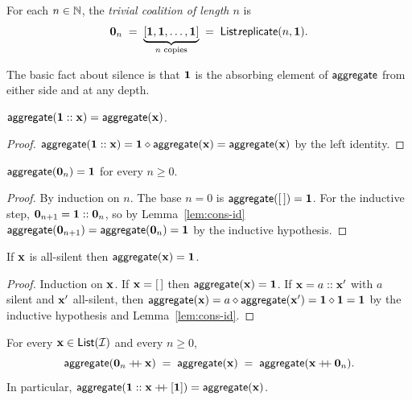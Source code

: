 \begin{definition}\label{def:trivial}
For each $n \in \mathbb{N}$, the \emph{trivial coalition of length $n$} is
\[
  \mathbf{0}_n \;=\; \underbrace{[\mathbf{1}, \mathbf{1}, \ldots, \mathbf{1}]}_{n
  \text{ copies}} \;=\; \mathsf{List}.\!\mathsf{replicate}(n, \mathbf{1}).
\]
\end{definition}

The basic fact about silence is that $\mathbf{1}$ is the absorbing element
of $\mathsf{aggregate}$ from either side and at any depth.

\begin{lemma}\label{lem:cons-id}
$\mathsf{aggregate}(\mathbf{1} :: \mathbf{x}) = \mathsf{aggregate}(\mathbf{x})$.
\end{lemma}

\begin{proof}
$\mathsf{aggregate}(\mathbf{1} :: \mathbf{x}) = \mathbf{1} \mathbin{\diamond} \mathsf{aggregate}(\mathbf{x}) =
\mathsf{aggregate}(\mathbf{x})$ by the left identity.
\end{proof}

\begin{lemma}\label{lem:trivial}
$\mathsf{aggregate}(\mathbf{0}_n) = \mathbf{1}$ for every $n \geq 0$.
\end{lemma}

\begin{proof}
By induction on $n$. The base $n = 0$ is $\mathsf{aggregate}([\,]) = \mathbf{1}$.
For the inductive step, $\mathbf{0}_{n+1} = \mathbf{1} ::
\mathbf{0}_n$, so by Lemma~\ref{lem:cons-id} $\mathsf{aggregate}(\mathbf{0}_{n+1})
= \mathsf{aggregate}(\mathbf{0}_n) = \mathbf{1}$ by the inductive hypothesis.
\end{proof}

\begin{lemma}\label{lem:all-silent}
If $\mathbf{x}$ is all-silent then $\mathsf{aggregate}(\mathbf{x}) = \mathbf{1}$.
\end{lemma}

\begin{proof}
Induction on $\mathbf{x}$. If $\mathbf{x} = [\,]$ then $\mathsf{aggregate}(\mathbf{x}) = \mathbf{1}$.
If $\mathbf{x} = a :: \mathbf{x}'$ with $a$ silent and $\mathbf{x}'$ all-silent, then
$\mathsf{aggregate}(\mathbf{x}) = a \mathbin{\diamond} \mathsf{aggregate}(\mathbf{x}') = \mathbf{1} \mathbin{\diamond} \mathbf{1}
= \mathbf{1}$ by the inductive hypothesis and Lemma~\ref{lem:cons-id}.
\end{proof}

\begin{proposition}\label{prop:bulk}
For every $\mathbf{x} \in \mathsf{List}(\mathcal{I})$ and every $n \geq 0$,
\[
  \mathsf{aggregate}(\mathbf{0}_n \mathbin{+\!\!+} \mathbf{x})
  \;=\; \mathsf{aggregate}(\mathbf{x})
  \;=\; \mathsf{aggregate}(\mathbf{x} \mathbin{+\!\!+} \mathbf{0}_n).
\]
In particular, $\mathsf{aggregate}(\mathbf{1} :: \mathbf{x} \mathbin{+\!\!+} [\mathbf{1}]) = \mathsf{aggregate}(\mathbf{x})$.
\end{proposition}

